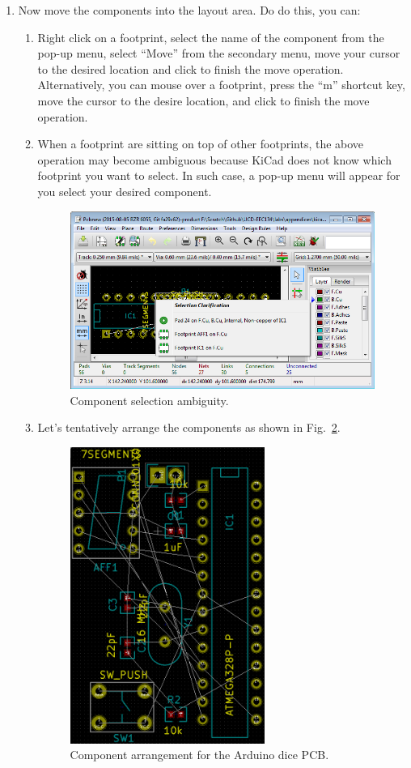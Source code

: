\documentclass[12pt,letterpaper]{scrartcl}
\begin{document}
\begin{enumerate}
	\item Now move the components into the layout area. Do do this, you can:
		\begin{enumerate}
			\item Right click on a footprint, select the name of the component from the pop-up menu, select ``Move'' from the secondary menu, move your cursor to the desired location and click to finish the move operation. Alternatively, you can mouse over a footprint, press the ``m'' shortcut key, move the cursor to the desire location, and click to finish the move operation. 
			
			\item When a footprint are sitting on top of other footprints, the above operation may become ambiguous because KiCad does not know which footprint you want to select. In such case, a pop-up menu will appear for you select your desired component. 
				\begin{figure}[h]
					\centering
					\includegraphics[width=4in]{ambiguity}
					\caption{Component selection ambiguity.}
					\label{fig:ambiguity}
				\end{figure}
			
			\item Let's tentatively arrange the components as shown in Fig.~\ref{fig:layout-iniital}. 
				\begin{figure}[hp]
					\centering
					\includegraphics[width=2.5in]{layout-initial}
					\caption{Component arrangement for the Arduino dice PCB.}
					\label{fig:layout-iniital}
				\end{figure}
		\end{enumerate}
		

\end{enumerate}
\end{document}
